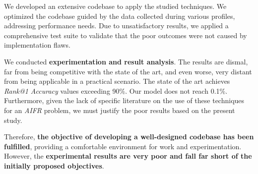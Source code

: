 We developed an extensive codebase to apply the studied techniques. We optimized the codebase guided by the data collected during various profiles, addressing performance needs. Due to unsatisfactory results, we applied a comprehensive test suite to validate that the poor outcomes were not caused by implementation flaws.

We conducted \textbf{experimentation and result analysis}. The results are dismal, far from being competitive with the state of the art, and even worse, very distant from being applicable in a practical scenario. The state of the art achieves \textit{Rank@1 Accuracy} values exceeding 90\%. Our model does not reach 0.1\%. Furthermore, given the lack of specific literature on the use of these techniques for an \textit{AIFR} problem, we must justify the poor results based on the present study.

Therefore, \textbf{the objective of developing a well-designed codebase has been fulfilled}, providing a comfortable environment for work and experimentation. However, the \textbf{experimental results are very poor and fall far short of the initially proposed objectives}.

\endinput

